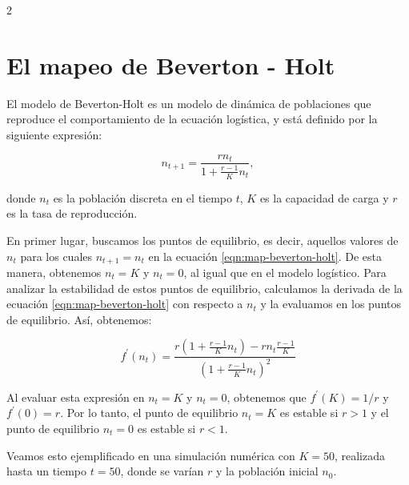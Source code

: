 \documentclass[spanish, 12pt, a4paper]{article}
\begin{document}
\maketitle
\thispagestyle{fancy}
\setcounter{page}{1}
\maketitle
\begin{multicols}{2}

\section{El mapeo de Beverton - Holt}
El modelo de Beverton-Holt es un modelo de dinámica de poblaciones que reproduce el comportamiento de la ecuación logística, y está definido por la siguiente expresión:

\begin{equation}
n_{t+1} = \frac{r n_t}{1 + \frac{r-1}{K} n_t},
\label{eqn:map-beverton-holt}
\end{equation}

donde $n_t$ es la población discreta en el tiempo $t$, $K$ es la capacidad de carga y $r$ es la tasa de reproducción.

En primer lugar, buscamos los puntos de equilibrio, es decir, aquellos valores de $n_t$ para los cuales $n_{t+1} = n_t$ en la ecuación \eqref{eqn:map-beverton-holt}. De esta manera, obtenemos $n_t = K$ y $n_t = 0$, al igual que en el modelo logístico. Para analizar la estabilidad de estos puntos de equilibrio, calculamos la derivada de la ecuación \eqref{eqn:map-beverton-holt} con respecto a $n_t$ y la evaluamos en los puntos de equilibrio. Así, obtenemos:

\begin{equation}
f^{\prime}(n_t) = \frac{r\left( 1 + \frac{r - 1}{K} n_t \right) - r n_t \frac{r - 1}{K}}{\left( 1 + \frac{r - 1}{K} n_t \right)^2}
\label{eqn:derivada-beverton-holt}
\end{equation}

Al evaluar esta expresión en $n_t = K$ y $n_t = 0$, obtenemos que $f^{\prime}(K) = 1/r$ y $f^{\prime}(0) = r$. Por lo tanto, el punto de equilibrio $n_t = K$ es estable si $r > 1$ y el punto de equilibrio $n_t = 0$ es estable si $r < 1$.

Veamos esto ejemplificado en una simulación numérica con $K = 50$, realizada hasta un tiempo $t = 50$, donde se varían $r$ y la población inicial $n_0$.


\end{multicols}
\end{document}
